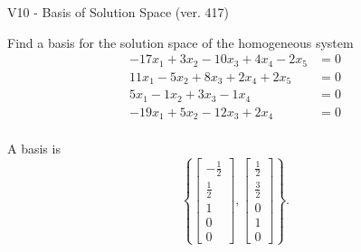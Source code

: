 \begin{exercise}
  \begin{exerciseTitle}V10 - Basis of Solution Space (ver. 417)\end{exerciseTitle}
  \begin{exerciseStatement}
    Find a basis for the solution space of the homogeneous system 
\begin{align*}
 -17 x_ 1 + 3 x_ 2 -10 x_ 3 + 4 x_ 4 -2 x_ 5 &= 0  \\ 
  11 x_ 1 -5 x_ 2 + 8 x_ 3 + 2 x_ 4 + 2 x_ 5 &= 0  \\ 
  5 x_ 1 -1 x_ 2 + 3 x_ 3 -1 x_ 4 &= 0  \\ 
  -19 x_ 1 + 5 x_ 2 -12 x_ 3 + 2 x_ 4 &= 0  \\ 
 \end{align*}


 
  \end{exerciseStatement}

  \begin{exerciseAnswer}
   A basis is   
\[\left\{\left[\begin{array}{c}
-\frac{1}{2} \\
\frac{1}{2} \\
1 \\
0 \\
0
\end{array}\right] , \left[\begin{array}{c}
\frac{1}{2} \\
\frac{3}{2} \\
0 \\
1 \\
0
\end{array}\right]\right\}.\]

  


  \end{exerciseAnswer}
\end{exercise}